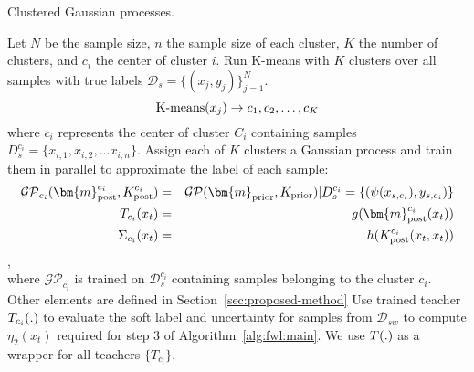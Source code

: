 \begin{algorithm}[t!]
\algfontsize
\caption{Clustered Gaussian processes.}%
\begin{algorithmic}[1]
\State Let $N$ be the sample size, $n$ the sample size of each cluster, $K$ the number of clusters, and $c_i$ the center of cluster $i$.
\medskip
\State Run K-means with $K$ clusters over all samples with true labels $\mathcal{D}_s=\{(x_j,y_j)\}_{j=1}^N$.
\begin{equation*}
    {\rm K\mbox{-}means}({x_j}) \rightarrow {c_1, c_2, \ldots, c_K}
\end{equation*}
where $c_i$ represents the center of cluster $C_i$ containing samples $D_s^{c_i}=\{x_{i,1}, x_{i,2}, ... x_{i,n}\}$.
\medskip
\State Assign each of $K$ clusters a Gaussian process and train them in parallel to approximate the label of each sample:
\begin{eqnarray*}
\mathcal{GP}_{c_i}(\bm{m}_{\rm post}^{c_i}, K_{\rm post}^{c_i})&=&\mathcal{GP}(\bm{m}_{\rm prior}, K_{\rm prior}) | D_s^{c_i}=\{(\psi(x_{s,c_i}),y_{s,c_i})\}\\
\tfunc_{c_i}(x_t) &=& g(\bm{m}_{\rm post}^{c_i}(x_t))\\
\Sigma_{c_i}(x_t) &=& h(K_{\rm post}^{c_i}(x_t,x_t))
\end{eqnarray*}, \\
where $\mathcal{GP}_{c_i}$ is trained on $\mathcal{D}_s^{c_i}$ containing samples belonging to the cluster $c_i$. Other elements are defined in Section~\ref{sec:proposed-method}
\medskip
\State Use trained teacher $T_{c_i}(.)$ to evaluate the soft label and uncertainty for samples from $\mathcal{D}_{sw}$ to compute $\eta_2(x_t)$ required for step 3 of Algorithm~\ref{alg:fwl:main}. We use $T(.)$ as a wrapper for all teachers $\{T_{c_i}\}$.
\end{algorithmic}
\label{alg:CGP}
\end{algorithm}
\shrink
